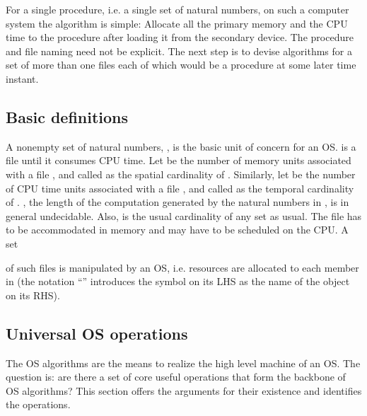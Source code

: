 \documentclass[draft]{article}
\begin{document}
For a single procedure, i.e.  a single set of natural numbers, on such
a computer  system the algorithm  is simple: Allocate all  the primary
memory and  the CPU time  to the procedure  after loading it  from the
secondary device.  The procedure and file naming need not be explicit.
The next step is to devise algorithms for a set of more than one files
each of which would be a  procedure at some later time instant.

\subsection{Basic definitions}
\label{sec:basic:defns}

A nonempty set  of natural numbers, , is the  basic unit of concern
for an OS.    is a file  until it consumes CPU time.   Let  be the  number of memory units associated with
a file , and called  as the spatial cardinality of .  Similarly,
let  be the number  of CPU time units
associated with a file ,  and called as the temporal cardinality of
.   ,  the length  of  the  computation  generated by  the
natural  numbers in  , is  in  general undecidable.   Also,   is the  usual cardinality of  any set   as
usual.  The file  has to  be accommodated in memory and may have to
be scheduled on the CPU.  A set 

of such files is manipulated by an OS, i.e. resources are allocated to
each member in  (the notation ``'' introduces the symbol on
its LHS as the name of the object on its RHS).

\subsection{Universal OS operations}
\label{sec:universal:os:functions}

The OS algorithms  are the means to realize the  high level machine of
an OS.   The question is:  are there a  set of core  useful operations
that  form the  backbone of  OS algorithms?   This section  offers the
arguments for their existence and identifies the operations.
\end{document}
